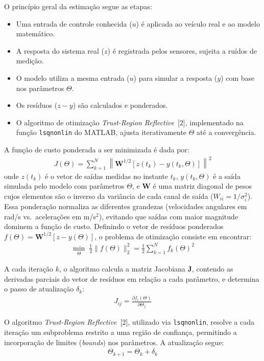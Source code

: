 \documentclass[letterpaper, 10 pt, conference]{ieeeconf}
\begin{document}
O princípio geral da estimação segue as etapas:
\begin{itemize}
    \item Uma entrada de controle conhecida ($u$) é aplicada ao veículo real e ao modelo matemático.
    \item A resposta do sistema real ($z$) é registrada pelos sensores, sujeita a ruídos de medição.
    \item O modelo utiliza a mesma entrada ($u$) para simular a resposta ($y$) com base nos parâmetros $\Theta$.
    \item Os resíduos ($z - y$) são calculados e ponderados.
    \item O algoritmo de otimização \textit{Trust-Region Reflective}~[2], implementado na função \texttt{lsqnonlin} do MATLAB, ajusta iterativamente $\Theta$ até a convergência.
\end{itemize}

A função de custo ponderada a ser minimizada é dada por:
\begin{align}
J(\Theta) = \sum_{k=1}^{N} \left\| \mathbf{W}^{1/2} \left[ z(t_{k}) - y(t_{k},\Theta) \right] \right\|^2
\end{align}
onde $z(t_k)$ é o vetor de saídas medidas no instante $t_k$, $y(t_k, \Theta)$ é a saída simulada pelo modelo com parâmetros $\Theta$, e $\mathbf{W}$ é uma matriz diagonal de pesos cujos elementos são o inverso da variância de cada canal de saída ($W_{ii} = 1/\sigma_i^2$). Essa ponderação normaliza as diferentes grandezas (velocidades angulares em rad/s vs.\ acelerações em m/s$^2$), evitando que saídas com maior magnitude dominem a função de custo. Definindo o vetor de resíduos ponderados $f(\Theta) = \mathbf{W}^{1/2}[z - y(\Theta)]$, o problema de otimização consiste em encontrar:
\begin{align}
\min_{\Theta} \; \frac{1}{2}\|f(\Theta)\|_{2}^2 = \frac{1}{2}\sum_{k=1}^{N} f_{k}(\Theta)^2
\end{align}

A cada iteração $k$, o algoritmo calcula a matriz Jacobiana $\mathbf{J}$, contendo as derivadas parciais do vetor de resíduos em relação a cada parâmetro, e determina o passo de atualização $\delta_k$:
\begin{align}
J_{ij} = \frac{\partial f_i(\Theta)}{\partial \Theta_j}
\end{align}

O algoritmo \textit{Trust-Region Reflective}~[2], utilizado via \texttt{lsqnonlin}, resolve a cada iteração um subproblema restrito a uma região de confiança, permitindo a incorporação de limites (\textit{bounds}) nos parâmetros. A atualização segue:
\begin{align}
\Theta_{k+1} = \Theta_{k} + \delta_k
\end{align}
\end{document}
